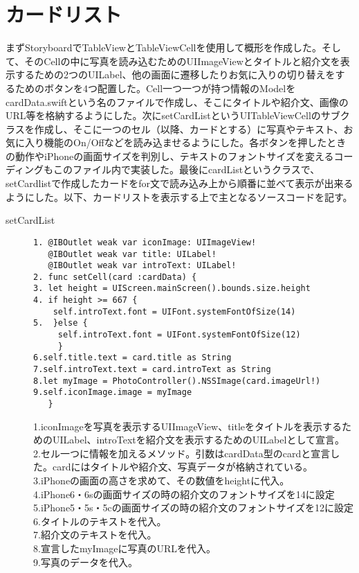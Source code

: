 \section{カードリスト}
まずStoryboardでTableViewとTableViewCellを使用して概形を作成した。そして、そのCellの中に写真を読み込むためのUIImageViewとタイトルと紹介文を表示するための2つのUILabel、他の画面に遷移したりお気に入りの切り替えをするためのボタンを4つ配置した。Cell一つ一つが持つ情報のModelをcardData.swiftという名のファイルで作成し、そこにタイトルや紹介文、画像のURL等を格納するようにした。次にsetCardListというUITableViewCellのサブクラスを作成し、そこに一つのセル（以降、カードとする）に写真やテキスト、お気に入り機能のOn/Offなどを読み込ませるようにした。各ボタンを押したときの動作やiPhoneの画面サイズを判別し、テキストのフォントサイズを変えるコーディングもこのファイル内で実装した。最後にcardListというクラスで、setCardlistで作成したカードをfor文で読み込み上から順番に並べて表示が出来るようにした。以下、カードリストを表示する上で主となるソースコードを記す。

\begin{description}
\item[setCardList]\mbox{} 
\begin{lstlisting}[basicstyle=\ttfamily\footnotesize, frame=single]
1. @IBOutlet weak var iconImage: UIImageView!
   @IBOutlet weak var title: UILabel!
   @IBOutlet weak var introText: UILabel!
2. func setCell(card :cardData) {
3. let height = UIScreen.mainScreen().bounds.size.height
4. if height >= 667 {
    self.introText.font = UIFont.systemFontOfSize(14)
5.  }else {
     self.introText.font = UIFont.systemFontOfSize(12)
     }
6.self.title.text = card.title as String
7.self.introText.text = card.introText as String
8.let myImage = PhotoController().NSSImage(card.imageUrl!)
9.self.iconImage.image = myImage
   }
 \end{lstlisting}

1.iconImageを写真を表示するUIImageView、titleをタイトルを表示するためのUILabel、introTextを紹介文を表示するためのUILabelとして宣言。\\
2.セル一つに情報を加えるメソッド。引数はcardData型のcardと宣言した。cardにはタイトルや紹介文、写真データが格納されている。\\
3.iPhoneの画面の高さを求めて、その数値をheightに代入。\\
4.iPhone6・6sの画面サイズの時の紹介文のフォントサイズを14に設定 \\
5.iPhone5・5s・5cの画面サイズの時の紹介文のフォントサイズを12に設定 \\
6.タイトルのテキストを代入。 \\
7.紹介文のテキストを代入。 \\
8.宣言したmyImageに写真のURLを代入。 \\
9.写真のデータを代入。 \\
\end{description}

